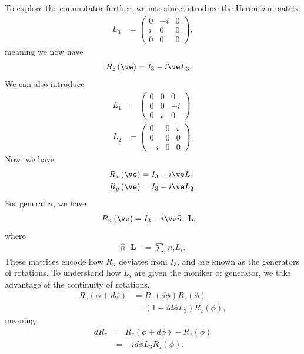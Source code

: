 \documentclass[10pt]{mypackage}
\begin{document}
{To explore the commutator further, we introduce introduce the Hermitian matrix
\begin{align*}
  L_3 &= \begin{pmatrix}0 & -i & 0 \\ i & 0 & 0 \\ 0 & 0 & 0\end{pmatrix},
\end{align*}
meaning we now have
\begin{align*}
  R_z\left(\ve\right) &= I_{3} - i\ve L_{3},
\end{align*}
We can also introduce
\begin{align*}
  L_1 &= \begin{pmatrix}0 & 0 & 0 \\ 0 & 0 & -i \\ 0 & i & 0\end{pmatrix}\\
  L_2 &= \begin{pmatrix}0 & 0 & i \\ 0 & 0 & 0 \\ -i & 0 & 0\end{pmatrix}.
\end{align*}
Now, we have
\begin{align*}
  R_x\left(\ve\right) &= I_{3} - i\ve L_{1}\\
  R_y\left(\ve\right) &= I_{3} - i\ve L_{2}.
\end{align*}
For general $n$, we have
\begin{align*}
  R_n\left(\ve\right) &= I_{3} - i\ve \widehat{n}\cdot \mathbf{L},
\end{align*}
where
\begin{align*}
  \widehat{n}\cdot \mathbf{L} &= \sum_{i}n_iL_{i}.
\end{align*}
These matrices encode how $R_n$ deviates from $I_{3}$, and are known as the generators of rotations.\newline
}
To understand how $L_{i}$ are given the moniker of generator, we take advantage of the continuity of rotations,
\begin{align*}
  R_z\left(\phi + d\phi\right) &= R_z\left(d\phi\right)R_z\left(\phi\right)\\
                               &= \left(1-id\phi L_{3}\right)R_{z}\left(\phi\right),
\end{align*}
meaning
\begin{align*}
  dR_z &= R_z\left(\phi + d\phi\right) - R_z\left(\phi\right)\\
       &= -id\phi L_{3}R_z\left(\phi\right).
\end{align*}
\end{document}
